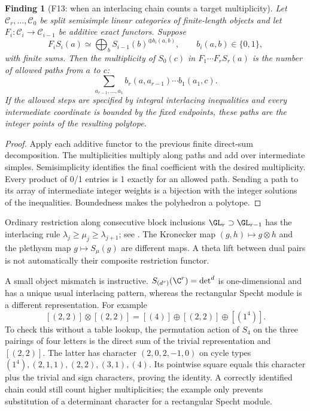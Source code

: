 \documentclass[11pt,a4paper]{article}
\newcommand{\mathscr}{\mathcal}
\newcommand{\fid}[1]{\textsf{#1}}\newcommand{\gate}[1]{\textsf{#1}}
\theoremstyle{named}\newtheorem{finding}{Finding}[section]
\theoremstyle{definition}\newtheorem{definition}[finding]{Definition}
\theoremstyle{remark}\newtheorem{remark}[finding]{Remark}
\begin{document}
\begin{finding}[\fid{F13}: when an interlacing chain counts a target multiplicity]\label{f:branching}
Let $\mathscr C_r,\ldots,\mathscr C_0$ be split semisimple linear categories of finite-length objects and let $F_i:\mathscr C_i\to\mathscr C_{i-1}$ be additive exact functors. Suppose
\[
 F_i S_i(a)\simeq\bigoplus_b S_{i-1}(b)^{\oplus b_i(a,b)},\qquad b_i(a,b)\in\{0,1\},
\]
with finite sums. Then the multiplicity of $S_0(c)$ in $F_1\cdots F_rS_r(a)$ is the number of allowed paths from $a$ to $c$:
\[
 \sum_{a_{r-1},\ldots,a_1}
 b_r(a,a_{r-1})\cdots b_1(a_1,c).
\]
If the allowed steps are specified by integral interlacing inequalities and every intermediate coordinate is bounded by the fixed endpoints, these paths are the integer points of the resulting polytope.
\end{finding}
\begin{proof}
Apply each additive functor to the previous finite direct-sum decomposition. The multiplicities multiply along paths and add over intermediate simples. Semisimplicity identifies the final coefficient with the desired multiplicity. Every product of 0/1 entries is 1 exactly for an allowed path. Sending a path to its array of intermediate integer weights is a bijection with the integer solutions of the inequalities. Boundedness makes the polyhedron a polytope.
\end{proof}
Ordinary restriction along consecutive block inclusions $\GL_r\supset\GL_{r-1}$ has the interlacing rule $\lambda_j\ge\mu_j\ge\lambda_{j+1}$; see \cite[Theorem 2.1, equation (2.2), and the patterns (2.4)]{Molev}. The Kronecker map $(g,h)\mapsto g\otimes h$ and the plethysm map $g\mapsto S_\mu(g)$ are different maps. A theta lift between dual pairs is not automatically their composite restriction functor.

A small object mismatch is instructive. $S_{(d^r)}(\C^r)=\det^d$ is one-dimensional and has a unique usual interlacing pattern, whereas the rectangular Specht module is a different representation. For example
\[
 [(2,2)]\otimes[(2,2)]=[(4)]\oplus[(2,2)]\oplus[(1^4)].
\]
To check this without a table lookup, the permutation action of $S_4$ on the three pairings of four letters is the direct sum of the trivial representation and $[(2,2)]$. The latter has character $(2,0,2,-1,0)$ on cycle types $(1^4),(2,1,1),(2,2),(3,1),(4)$. Its pointwise square equals this character plus the trivial and sign characters, proving the identity. A correctly identified chain could still count higher multiplicities; the example only prevents substitution of a determinant character for a rectangular Specht module.
\end{document}
